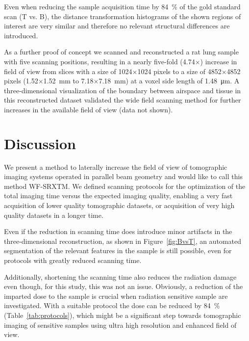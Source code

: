 Even when reducing the sample acquisition time by \SI{84}{\percent} of the gold standard scan (T vs. B), the distance transformation histograms of the shown regions of interest are very similar and therefore no relevant structural differences are introduced.

As a further proof of concept we scanned and reconstructed a rat lung sample with five scanning positions, resulting in a nearly five-fold (4.74$\times$) increase in field of view from slices with a size of 1024$\times$1024 pixels to a size of 4852$\times$4852 pixels (1.52$\times$\SI{1.52}{\milli\meter} to 7.18$\times$\SI{7.18}{\milli\meter}) at a voxel side length of \SI{1.48}{\micro\meter}. A three-dimensional visualization of the boundary between airspace and tissue in this reconstructed dataset validated the wide field scanning method for further increases in the available field of view (data not shown).

\section{Discussion}\label{sec:Discussion}
We present a method to laterally increase the field of view of tomographic imaging systems operated in parallel beam geometry and would like to call this method \ac{WF-SRXTM}. We defined scanning protocols for the optimization of the total imaging time versus the expected imaging quality, enabling a very fast acquisition of lower quality tomographic datasets, or acquisition of very high quality datasets in a longer time.

Even if the reduction in scanning time does introduce minor artifacts in the three-dimensional reconstruction, as shown in Figure~\ref{fig:BvsT}, an automated segmentation of the relevant features in the sample is still possible, even for protocols with greatly reduced scanning time. 

Additionally, shortening the scanning time also reduces the radiation damage even though, for this study, this was not an issue. Obviously, a reduction of the imparted dose to the sample is crucial when radiation sensitive sample are investigated. With a
suitable protocol the dose can be reduced by \SI{84}{\percent} (Table~\ref{tab:protocols}), which might be a significant step towards tomographic imaging of sensitive samples using ultra high resolution and enhanced field of view. 

